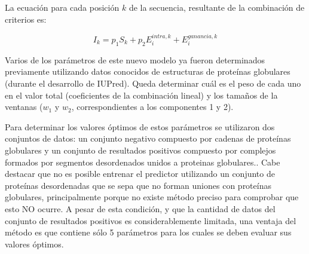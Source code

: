 La ecuación para cada posición $k$ de la secuencia, resultante de la combinación de criterios es:

\begin{equation}\label{scorefinal}
I_k = p_1S_k + p_2E_i^{intra,k} + E_i^{ganancia,k}
\end{equation}


Varios de los parámetros de este nuevo modelo ya fueron determinados previamente utilizando datos conocidos de estructuras de proteínas globulares (durante el desarrollo de IUPred).
Queda determinar cuál es el peso de cada uno en el valor total (coeficientes de la combinación lineal) y los tamaños de la ventanas ($w_1$ y $w_2$, correspondientes a los componentes 1 y 2).

Para determinar los valores óptimos de estos parámetros se utilizaron dos conjuntos de datos: un conjunto negativo compuesto por cadenas de proteínas globulares y un conjunto de resultados positivos compuesto por complejos formados por segmentos desordenados unidos a proteinas globulares..
Cabe destacar que no es posible entrenar el predictor utilizando un conjunto de proteínas desordenadas que se sepa que no forman uniones con proteínas globulares, 
principalmente porque no existe método preciso para comprobar que esto NO ocurre. 
A pesar de esta condición, y que la cantidad de datos del conjunto de resultados positivos es considerablemente limitada, una ventaja del método es que contiene sólo 5 parámetros para los cuales se deben evaluar sus valores óptimos. 


